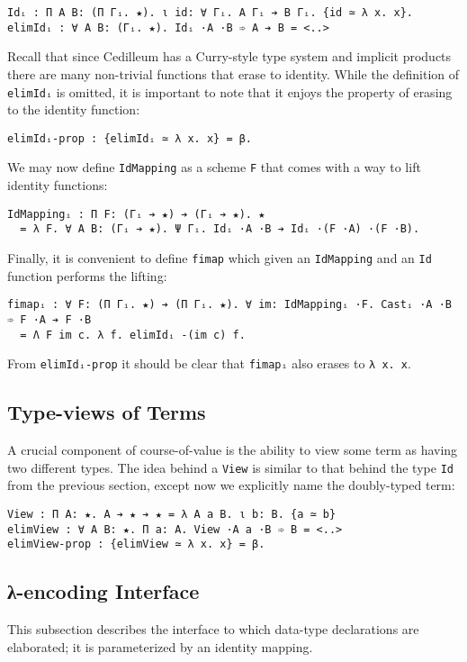 \documentclass{article}
\begin{document}
\begin{verbatim}
Idᵢ : Π A B: (Π Γᵢ. ★). ι id: ∀ Γᵢ. A Γᵢ ➔ B Γᵢ. {id ≃ λ x. x}.
elimIdᵢ : ∀ A B: (Γᵢ. ★). Idᵢ ·A ·B ➾ A ➔ B = <..>
\end{verbatim}

Recall that since Cedilleum has a Curry-style type system and implicit
products there are many non-trivial functions that erase to identity.
While the definition of \verb;elimIdᵢ; is omitted, it is important to note that
it enjoys the property of erasing to the identity function:
\begin{verbatim}
elimIdᵢ-prop : {elimIdᵢ ≃ λ x. x} = β.
\end{verbatim}

We may now define \verb;IdMapping; as a scheme \verb;F; that comes with a way to
lift identity functions:
\begin{verbatim}
IdMappingᵢ : Π F: (Γᵢ ➔ ★) ➔ (Γᵢ ➔ ★). ★
  = λ F. ∀ A B: (Γᵢ ➔ ★). Ψ Γᵢ. Idᵢ ·A ·B ➔ Idᵢ ·(F ·A) ·(F ·B).
\end{verbatim}

Finally, it is convenient to define \verb;fimap; which given an
\verb;IdMapping; and an \verb;Id; function performs the lifting:
\begin{verbatim}
fimapᵢ : ∀ F: (Π Γᵢ. ★) ➔ (Π Γᵢ. ★). ∀ im: IdMappingᵢ ·F. Castᵢ ·A ·B ➾ F ·A ➔ F ·B
  = Λ F im c. λ f. elimIdᵢ -(im c) f.
\end{verbatim}

From \verb;elimIdᵢ-prop; it should be clear that \verb;fimapᵢ; also erases to
\verb;λ x. x;.

\subsection{Type-views of Terms}
A crucial component of course-of-value is the ability to view some term as having
two different types. The idea behind a \verb;View; is similar to that behind the
type \verb;Id; from the previous section, except now we explicitly name the
doubly-typed term:
\begin{verbatim}
View : Π A: ★. A ➔ ★ ➔ ★ = λ A a B. ι b: B. {a ≃ b}
elimView : ∀ A B: ★. Π a: A. View ·A a ·B ➾ B = <..>
elimView-prop : {elimView ≃ λ x. x} = β.
\end{verbatim}

\subsection{λ-encoding Interface}
This subsection describes the interface to which data-type declarations are
elaborated; it is parameterized by an identity mapping.
\end{document}
